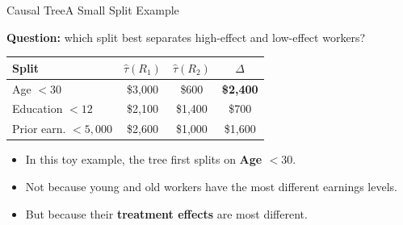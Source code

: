 \documentclass[hyperref={pdfpagelabels=false}]{beamer}
\begin{document}
\begin{frame}{Causal Tree}{A Small Split Example}

\textbf{Question:} which split best separates high-effect and low-effect workers?

\vspace{0.2cm}
\begin{center}
\scriptsize
\begin{tabular}{lccc}
\toprule
Split & $\hat{\tau}(R_1)$ & $\hat{\tau}(R_2)$ & $\Delta$ \\
\midrule
Age $<30$                 & \$3,000 & \$600  & \textbf{\$2,400} \\
Education $<12$           & \$2,100 & \$1,400 & \$700 \\
Prior earn. $<5{,}000$    & \$2,600 & \$1,000 & \$1,600 \\
\bottomrule
\end{tabular}
\end{center}

\vspace{0.18cm}
\begin{itemize}
  \item In this toy example, the tree first splits on \textbf{Age $<30$}.
  \vspace{0.05cm}
  \item Not because young and old workers have the most different earnings levels.
  \vspace{0.05cm}
  \item But because their \textbf{treatment effects} are most different.
\end{itemize}

\end{frame}
\end{document}
